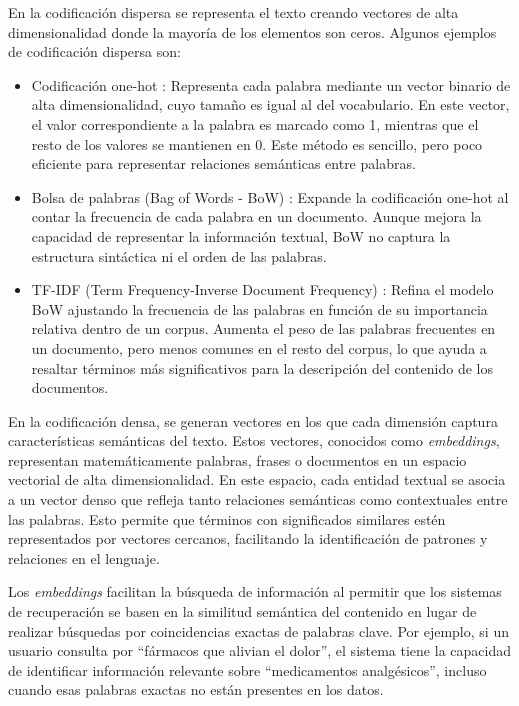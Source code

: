\documentclass{article}
\begin{document}
En la codificación dispersa se representa el texto creando vectores de alta dimensionalidad donde la mayoría de los elementos son ceros. Algunos ejemplos de codificación dispersa son:
\begin{itemize} 
    \item Codificación one-hot \cite{harris2010digital}: Representa cada palabra mediante un vector binario de alta dimensionalidad, cuyo tamaño es igual al del vocabulario. En este vector, el valor correspondiente a la palabra es marcado como 1, mientras que el resto de los valores se mantienen en 0. Este método es sencillo, pero poco eficiente para representar relaciones semánticas entre palabras.
    \item Bolsa de palabras (Bag of Words - BoW) \cite{harris1954distributional}: Expande la codificación one-hot al contar la frecuencia de cada palabra en un documento. Aunque mejora la capacidad de representar la información textual, BoW no captura la estructura sintáctica ni el orden de las palabras. 
    \item TF-IDF (Term Frequency-Inverse Document Frequency) \cite{rajaraman2011data}: Refina el modelo BoW ajustando la frecuencia de las palabras en función de su importancia relativa dentro de un corpus. Aumenta el peso de las palabras frecuentes en un documento, pero menos comunes en el resto del corpus, lo que ayuda a resaltar términos más significativos para la descripción del contenido de los documentos. 
\end{itemize}

En la codificación densa, se generan vectores en los que cada dimensión captura características semánticas del texto. Estos vectores, conocidos como \textit{embeddings}, representan matemáticamente palabras, frases o documentos en un espacio vectorial de alta dimensionalidad. En este espacio, cada entidad textual se asocia a un vector denso que refleja tanto relaciones semánticas como contextuales entre las palabras. Esto permite que términos con significados similares estén representados por vectores cercanos, facilitando la identificación de patrones y relaciones en el lenguaje.

Los \textit{embeddings} facilitan la búsqueda de información al permitir que los sistemas de recuperación se basen en la similitud semántica del contenido en lugar de realizar búsquedas por coincidencias exactas de palabras clave. Por ejemplo, si un usuario consulta por ``fármacos que alivian el dolor'', el sistema tiene la capacidad de identificar información relevante sobre ``medicamentos analgésicos'', incluso cuando esas palabras exactas no están presentes en los datos.
\end{document}
